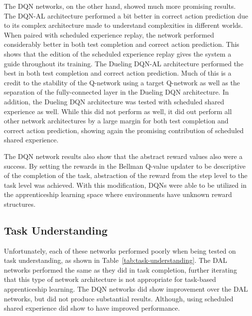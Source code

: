 \documentclass[12pt,american]{report}
\begin{document}
The DQN networks, on the other hand, showed much more promising results. The DQN-AL architecture performed a bit better in correct action prediction due to its complex architecture made to understand complexities in different worlds. When paired with scheduled experience replay, the network performed considerably better in both test completion and correct action prediction.  This shows that the edition of the scheduled experience replay gives the system a guide throughout its training.  The Dueling DQN-AL architecture performed the best in both test completion and correct action prediction.  Much of this is a credit to the stability of the Q-network using a target Q-network as well as the separation of the fully-connected layer in the Dueling DQN architecture.  In addition, the Dueling DQN architecture was tested with scheduled shared experience as well.  While this did not perform as well, it did out perform all other network architectures by a large margin for both test completion and correct action prediction, showing again the promising contribution of scheduled shared experience.  

The DQN network results also show that the abstract reward values also were a success. By setting the rewards in the Bellman Q-value updater to be descriptive of the completion of the task, abstraction of the reward from the step level to the task level was achieved.  With this modification, DQNs were able to be utilized in the apprenticeship learning space where environments have unknown reward structures. 

\subsection{Task Understanding}
Unfortunately, each of these networks performed poorly when being tested on task understanding, as shown in Table~\ref{tab:task-understanding}.  The DAL networks performed the same as they did in task completion, further iterating that this type of network architecture is not appropriate for task-based apprenticeship learning. The DQN networks did show improvement over the DAL networks, but did not produce substantial results.  Although, using scheduled shared experience did show to have improved performance.
\end{document}
